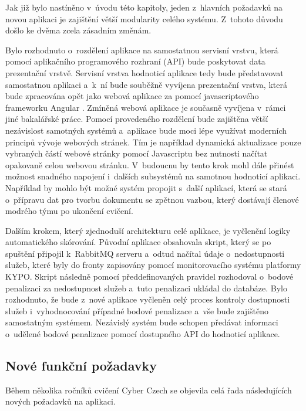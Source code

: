 \documentclass[
  digital,
  twoside,
  table, 
  nolof, 
  nolot
]{fithesis3}
\begin{document}
Jak již bylo nastíněno v~úvodu této kapitoly, jeden z~hlavních požadavků na novou aplikaci je zajištění větší modularity celého systému. Z~tohoto důvodu došlo ke dvěma zcela zásadním změnám.

Bylo rozhodnuto o~rozdělení aplikace na samostatnou servisní vrstvu, která pomocí aplikačního programového rozhraní (API) bude poskytovat data prezentační vrstvě. Servisní vrstva hodnoticí aplikace tedy bude představovat samostatnou aplikaci a~k~ní bude souběžně vyvíjena prezentační vrstva, která bude zpracována opět jako webová aplikace za pomocí javascriptového frameworku Angular \cite{angular}. Zmíněná webová aplikace je současně vyvíjena v~rámci jiné bakalářské práce. Pomocí provedeného rozdělení bude zajištěna větší nezávislost samotných systémů a~aplikace bude moci lépe využívat moderních principů vývoje webových stránek. Tím je například dynamická aktualizace pouze vybraných částí webové stránky pomocí Javascriptu bez nutnosti načítat opakovaně celou webovou stránku. V~budoucnu by tento krok mohl dále přinést možnost snadného napojení i~dalších subsystémů na samotnou hodnoticí aplikaci. Například by mohlo být možné systém propojit s~další aplikací, která se stará o~přípravu dat pro tvorbu dokumentu se zpětnou vazbou, který dostávají členové modrého týmu po ukončení cvičení.

Dalším krokem, který zjednoduší architekturu celé aplikace, je vyčlenění logiky automatického skórování. Původní aplikace obsahovala skript, který se po spuštění připojil k~RabbitMQ serveru a~odtud načítal údaje o~nedostupnosti služeb, které byly do fronty zapisovány pomocí monitorovacího systému platformy KYPO. Skript následně pomocí předdefinovaných pravidel rozhodoval o~bodové penalizaci za nedostupnost služeb a~tuto penalizaci ukládal do databáze. Bylo rozhodnuto, že bude z~nové aplikace vyčleněn celý proces kontroly dostupnosti služeb i~vyhodnocování případné bodové penalizace a~vše bude zajištěno samostatným systémem. Nezávislý systém bude schopen předávat informaci o~udělené bodové penalizace pomocí dostupného API do hodnoticí aplikace.

\subsection{Nové funkční požadavky}
\label{novePozadavky}
Během několika ročníků cvičení Cyber Czech se objevila celá řada následujících nových požadavků na aplikaci.
\end{document}
